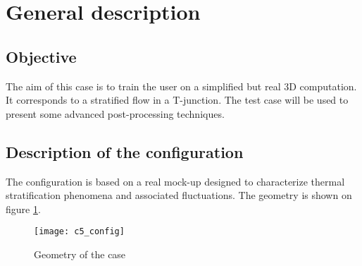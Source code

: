 
%
%
%
%


\section{General description}

        \subsection{Objective}

The aim of this case is to train the \CS user on a simplified but real 3D
computation. It corresponds to a stratified flow in a T-junction. The test case
will be used to present some advanced post-processing techniques.


        \subsection{Description of the configuration}

The configuration is based on a real mock-up designed to characterize thermal
stratification phenomena and associated fluctuations. The geometry is shown on
figure \ref{config}.


\begin{figure}[h!]
\begin{center}
\texttt{[image: c5\_config]}
\caption{Geometry of the case}
\label{config}
\end{center}
\end{figure}

